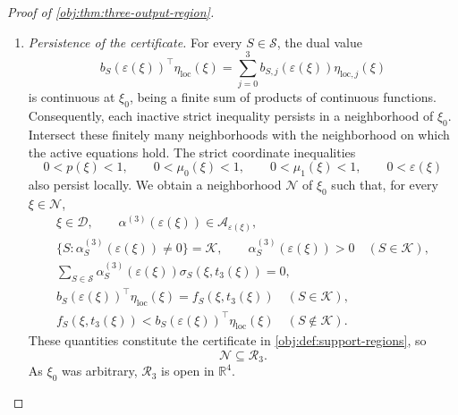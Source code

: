 \documentclass[11pt]{article}
\begin{document}
\begin{proof}[Proof of \cref{obj:thm:three-output-region}]
\begin{enumerate}
\[\begin{aligned}
(\mathsf A_3(\xi)\mathsf R_0)^{-1}
\bigl(\boldsymbol f_3(\xi)-\mathsf A_3(\xi)\eta^{(0)}\bigr)\\
&=\boldsymbol f_3(\xi).
\end{aligned}
\]
Thus the three active dual equalities hold locally, and the original inactive strict inequalities hold at the base point:
\[
f_S(\xi_0,t_3(\xi_0))
<
b_S(\varepsilon(\xi_0))^\top\eta_{\mathrm{loc}}(\xi_0)
\quad(S\notin\mathcal K).
\]

\item \textit{Persistence of the certificate.}
For every \(S\in\mathcal S\), the dual value
\[
b_S(\varepsilon(\xi))^\top\eta_{\mathrm{loc}}(\xi)
=
\sum_{j=0}^3b_{S,j}(\varepsilon(\xi))
\eta_{\mathrm{loc},j}(\xi)
\]
is continuous at \(\xi_0\), being a finite sum of products of continuous functions. Consequently, each inactive strict inequality persists in a neighborhood of \(\xi_0\). Intersect these finitely many neighborhoods with the neighborhood on which the active equations hold. The strict coordinate inequalities
\[
0<p(\xi)<1,\qquad
0<\mu_0(\xi)<1,\qquad
0<\mu_1(\xi)<1,\qquad
0<\varepsilon(\xi)
\]
also persist locally. We obtain a neighborhood \(\mathcal N\) of \(\xi_0\) such that, for every \(\xi\in\mathcal N\),
\[
\begin{gathered}
\xi\in\mathcal D,\qquad
\alpha^{(3)}(\varepsilon(\xi))\in\mathcal A_{\varepsilon(\xi)},\\
\{S:\alpha^{(3)}_S(\varepsilon(\xi))\ne0\}=\mathcal K,
\qquad
\alpha^{(3)}_S(\varepsilon(\xi))>0\quad(S\in\mathcal K),\\
\sum_{S\in\mathcal S}
\alpha^{(3)}_S(\varepsilon(\xi))\sigma_S(\xi,t_3(\xi))=0,\\
b_S(\varepsilon(\xi))^\top\eta_{\mathrm{loc}}(\xi)
=f_S(\xi,t_3(\xi))
\quad(S\in\mathcal K),\\
f_S(\xi,t_3(\xi))
<
b_S(\varepsilon(\xi))^\top\eta_{\mathrm{loc}}(\xi)
\quad(S\notin\mathcal K).
\end{gathered}
\]
These quantities constitute the certificate in \cref{obj:def:support-regions}, so
\[
\mathcal N\subseteq\mathcal R_3.
\]
As \(\xi_0\) was arbitrary, \(\mathcal R_3\) is open in \(\mathbb R^4\).


\end{enumerate}
\end{proof}
\end{document}
